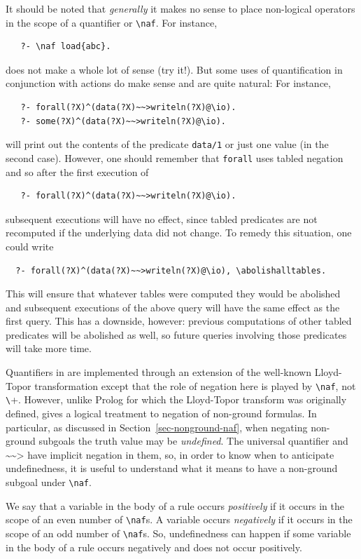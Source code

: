 \documentclass[11pt]{article}
\newcommand{\ERGO}{\mbox{\smaller{\ensuremath{\cal{E}}\smaller{{\sc{RGO}}}}}\xspace}
\newcommand{\FLSYSTEM}{\ERGO}
\newcommand{\rnafarr}{\texttt{\textasciitilde\textasciitilde>}}
\newcommand{\bs}{\textbackslash}
\newcommand{\PLGNAF}{\mbox{\texttt{\bs}+}\xspace}
\newcommand{\RULELOGNAF}{{\texttt{{\bs}naf}}\xspace}
\begin{document}
It should be noted that \emph{generally}   it makes no
sense to place non-logical operators in the scope of a quantifier or
\texttt{\RULELOGNAF}. For instance,
\begin{verbatim}
   ?- \naf load{abc}.
\end{verbatim}
does not make a whole lot of sense (try it!). But some uses of
quantification in conjunction with actions do make sense and are quite natural:
For instance,
\begin{verbatim}
   ?- forall(?X)^(data(?X)~~>writeln(?X)@\io).
   ?- some(?X)^(data(?X)~~>writeln(?X)@\io).
\end{verbatim}
will print out the contents of the predicate \texttt{data/1} or just one
value (in the second case).
However, one should remember that \texttt{forall} uses tabled negation and
so after the first execution of
\begin{verbatim}
   ?- forall(?X)^(data(?X)~~>writeln(?X)@\io).
\end{verbatim}
subsequent executions will have no effect, since tabled predicates are not
recomputed if the underlying data did not change. To remedy this situation,
one could write
\index{\bs{}abolishalltables}
\begin{verbatim}
  ?- forall(?X)^(data(?X)~~>writeln(?X)@\io), \abolishalltables.
\end{verbatim}
This will ensure that whatever tables were computed they would be abolished
and subsequent executions of the above query will have the same effect as
the first query. This has a downside, however: previous computations
of other tabled predicates will be abolished as well, so future queries
involving those predicates will take more time.

Quantifiers in \FLSYSTEM are implemented through an extension of
the well-known Lloyd-Topor
transformation \cite{Lloy84} except that the role of negation here is
played by \texttt{\RULELOGNAF}, not \PLGNAF. However, unlike Prolog for which the
Lloyd-Topor transform was originally defined, \FLSYSTEM gives a
logical treatment to negation of non-ground formulas. In particular, as
discussed in Section~\ref{sec-nonground-naf}, when
negating non-ground subgoals the truth value may be \emph{undefined}.
The universal quantifier and $\rnafarr$ have implicit negation in them, so, in order to
know when to anticipate undefinedness, it is useful
to understand what it means to have a non-ground subgoal under
\texttt{\RULELOGNAF}. 

We say that a variable in the body of a rule occurs \emph{positively} if it
occurs in the scope of an even number of  \texttt{\RULELOGNAF}s. A variable occurs
\emph{negatively} if it occurs in the scope of an odd number of
\texttt{\RULELOGNAF}s.  
So, undefinedness can happen if some variable in the body of a rule occurs
negatively and does not occur positively.
\end{document}
